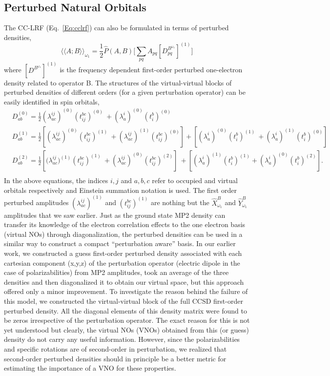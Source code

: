 \subsection{Perturbed Natural Orbitals}
The CC-LRF (Eq.~\ref{Eq:cclrf}) can also be formulated in terms of perturbed densities,
\begin{equation}
{\langle\langle A;B\rangle\rangle}_{\omega_1} =  \frac{1}{2}\hat{P}(A,B)\big[\sum_{pq} A_{pq}[{D^{B^{\omega_1}}_{pq}}]^{(1)}\big]
\end{equation}
where $[{D^{B^{\omega_1}}}]^{(1)}$ is the frequency dependent first-order
perturbed one-electron density related to operator B. The structures  
of the virtual-virtual blocks of perturbed densities of different orders
(for a given perturbation operator) can be easily identified in spin orbitals,
\begin{equation}
\begin{split}
& D^{(0)}_{ab} = \frac{1}{2}(\lambda^{ij}_{ac})^{(0)}(t^{bc}_{ij})^{(0)} \
+ (\lambda^{i}_{a})^{(0)}(t^{b}_{i})^{(0)} \\
&D^{(1)}_{ab} = \frac{1}{2}[(\lambda^{ij}_{ac})^{(0)}(t^{bc}_{ij})^{(1)} \
+ (\lambda^{ij}_{ac})^{(1)}(t^{bc}_{ij})^{(0)}] + [(\lambda^{i}_{a})^{(0)}(t^{b}_{i})^{(1)}\
 + (\lambda^{i}_{a})^{(1)}(t^{b}_{i})^{(0)}] \\
&D^{(2)}_{ab} = \frac{1}{2}[{(\lambda^{ij}_{ac}})^{(1)}(t^{bc}_{ij})^{(1)}\
 + (\lambda^{ij}_{ac})^{(0)}(t^{bc}_{ij})^{(2)}]\ 
+ [(\lambda^{i}_{a})^{(1)} (t^{b}_{i})^{(1)} + (\lambda^{i}_{a})^{(0)}(t^{b}_{i})^{(2)}].\\
\end{split}
\end{equation}
In the above equations, the indices $i,j$ and $a,b,c$ refer to occupied and virtual orbitals respectively and Einstein summation notation is used. The first order perturbed amplitudes $(\lambda^{ij}_{ac})^{(1)}$ and $(t^{bc}_{ij})^{(1)}$ are nothing but the $\hat{X}^{B}_{\omega_1}$ and $\hat{Y}^{B}_{\omega_1}$ 
amplitudes that we saw earlier. Just as the ground state MP2 density can transfer its knowledge of the electron correlation effects to the one electron basis (virtual NOs) through diagonalization, the perturbed densities can be used in a similar way to construct a compact ``perturbation aware'' basis. In our earlier work, we constructed a guess first-order perturbed density associated with each cartesian component (x,y,z) of the perturbation operator (electric dipole in the case of polarizabilities) from MP2 amplitudes, took an average of the three densities and then diagonalized it to obtain our virtual space, but this approach offered only a minor improvement\cite{Kumar17}. To investigate the reason behind the failure of this model, we constructed the virtual-virtual block of the full CCSD first-order perturbed density. All the diagonal elements of this density matrix were found to be zeros irrespective of the perturbation operator. The exact reason for this is not yet understood but clearly, the virtual NOs (VNOs) obtained from this (or guess) density do not carry any useful information. However, since the polarizabilities and specific rotations are of second-order in perturbation, we realized that second-order perturbed densities should in principle be a better metric for estimating the importance of a VNO for these properties.
